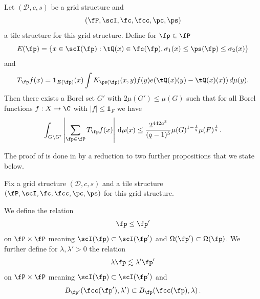 \begin{proposition}
\label{discrete-Carleson}
\leanok
{}
Let $(\mathcal{D}, c, s)$ be a grid structure and
\begin{equation*}
    (\fP,\scI,\fc,\fcc,\pc,\ps)
\end{equation*}
a tile structure for this grid structure.
Define for $\fp\in \fP$
\begin{equation}\label{defineep}
    E(\fp)=\{x\in \scI(\fp): \tQ(x)\in \fc(\fp) , {\sigma_1}(x)\le \ps(\fp)\le {\sigma_2}(x)\}
\end{equation}
and
\begin{equation}\label{definetp}
    T_{\fp} f(x)= \mathbf{1}_{E(\fp)}(x) \int K_{\ps(\fp)}(x,y) f(y) e(\tQ(x)(y)-\tQ(x)(x))\, d\mu(y).
\end{equation}
Then there exists a Borel set $G'$ with $2\mu(G') \leq \mu(G)$ such that for all Borel functions $f:X\to \C$ with $|f|\le \mathbf{1}_F$
we have
\begin{equation}
    \label{disclesssim}
   \int_{G \setminus G'} \left| \sum_{\fp \in \fP} T_{\fp} f (x) \right| \, \mathrm{d}\mu(x) \le \frac{2^{442a^3}}{(q-1)^5} \mu(G)^{1-\frac{1}{q}} \mu(F)^{\frac{1}{q}}\,.
\end{equation}
\end{proposition}









The proof of  is done in 
by a reduction to two further propositions that we state below.


Fix a grid structure $(\mathcal{D}, c, s)$ and a tile structure $(\fP,\scI,\fc,\fcc,\pc,\ps)$
for this grid structure.

We define the relation
\begin{equation}\label{straightorder}
    \fp\le \fp'
\end{equation}
 on $\fP\times \fP$ meaning
$\scI(\fp)\subset \scI(\fp')$ and
$\Omega(\fp')\subset \Omega(\fp)$.
We further define for $\lambda,\lambda' >0$
the relation
\begin{equation}\label{wiggleorder}
    \lambda \fp \lesssim \lambda' \fp'
\end{equation}
on $\fP\times \fP$ meaning
$\scI(\fp)\subset \scI(\fp')$ and
\begin{equation}
    B_{\fp'}(\fcc(\fp'),\lambda') \subset B_{\fp}(\fcc(\fp),\lambda)\, .
\end{equation}



